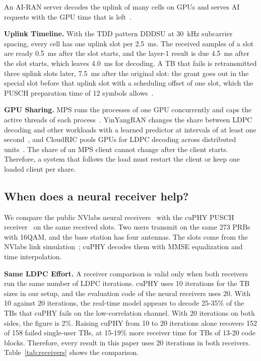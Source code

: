 \documentclass[acmsmall,screen,review,anonymous]{acmart}
\begin{document}
An AI-RAN server decodes the uplink of many cells on GPUs and serves AI requests with the GPU time that is
left~\cite{aerial,distributedairan}.

\noindent\textbf{Uplink Timeline.} With the TDD pattern DDDSU at 30~kHz subcarrier spacing, every cell has
one uplink slot per 2.5~ms. The received samples of a slot are ready 0.5~ms after the slot starts, and the
layer-1 result is due 4.5~ms after the slot starts, which leaves 4.0~ms for decoding. A TB that fails is
retransmitted three uplink slots later, 7.5~ms after the original slot: the grant goes out in the
special slot before that uplink slot with a scheduling offset of one slot, which the PUSCH preparation time
of 12 symbols allows~\cite{ts38214}.

\noindent\textbf{GPU Sharing.} MPS runs the processes of one GPU concurrently and caps the active threads of
each process~\cite{nvidiampS}. YinYangRAN changes the share between LDPC decoding and other workloads with
a learned predictor at intervals of at least one second~\cite{yinyangran}, and CloudRIC pools GPUs for LDPC
decoding across distributed units~\cite{cloudric}. The share of an MPS client cannot change after the client
starts. Therefore, a system that follows the load must restart the client or keep one loaded client per
share.

\subsection{When does a neural receiver help?}

We compare the public NVlabs neural receivers~\cite{nrx5g,nrxrt,neuralrxsw} with the cuPHY PUSCH
receiver~\cite{aerial} on the same received slots. Two users transmit on the same 273 PRBs with 16QAM, and
the base station has four antennas. The slots come from the NVlabs link simulation~\cite{sionna}; cuPHY
decodes them with MMSE equalization and time interpolation.

\noindent\textbf{Same LDPC Effort.} A receiver comparison is valid only when both receivers run the same
number of LDPC iterations. cuPHY uses 10 iterations for the TB sizes in our setup, and the evaluation code
of the neural receivers uses 20. With 10 against 20 iterations, the real-time model appears to decode
25-35\% of the TBs that cuPHY fails on the low-correlation channel. With 20 iterations on both sides, the
figure is 2\%. Raising cuPHY from 10 to 20 iterations alone recovers 152 of 158 failed single-user TBs, at
15-19\% more receiver time for TBs of 13-20 code blocks. Therefore, every result in this paper uses 20
iterations in both receivers. Table~\ref{tab:receivers} shows the comparison.
\end{document}
